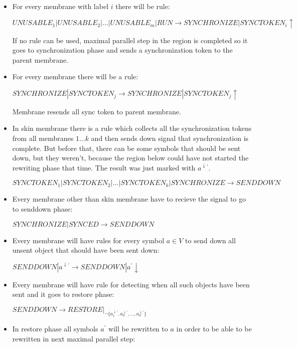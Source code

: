 \documentclass[a4paper,10pt]{article}
\begin{document}
\begin{dokaz}
\begin{itemize}
    

    \item For every membrane with label $i$ there will be rule:

    $UNUSABLE_1|UNUSABLE_2|\dots|UNUSABLE_m|RUN \rightarrow SYNCHRONIZE|SYNCTOKEN_i\uparrow$

    If no rule can be used, maximal parallel step in the region is completed so it goes to synchronization phase and sends a synchronization token to the parent membrane.

    \item For every membrane there will be a rule:

    $SYNCHRONIZE|SYNCTOKEN_j \rightarrow SYNCHRONIZE|SYNCTOKEN_j\uparrow$

    Membrane resends all sync token to parent membrane.

    \item In skin membrane there is a rule which collects all the synchronization tokens from all membranes $1\dots k$ and then sends down signal that synchronization is complete. But before that, there can be some symbols that should be sent down, but they weren't, because the region below could have not started the rewriting phase that time. The result was just marked with $a^{\downarrow\prime}$.

    $SYNCTOKEN_1|SYNCTOKEN_2|\dots|SYNCTOKEN_k|SYNCHRONIZE \rightarrow SENDDOWN$

    \item Every membrane other than skin membrane have to recieve the signal to go to senddown phase:

    $SYNCHRONIZE|SYNCED \rightarrow SENDDOWN$

    \item Every membrane will have rules for every symbol $a\in V$ to send down all unsent object that should have been sent down:

    $SENDDOWN|a^{\downarrow\prime} \rightarrow SENDDOWN|a^{\prime}\downarrow$

    \item Every membrane will have rule for detecting when all such objects have been sent and it goes to restore phase:

    $SENDDOWN \rightarrow RESTORE|_{\neg \{a_1^{\downarrow\prime}, a_n^{\downarrow\prime}, \dots, a_n^{\downarrow\prime}\}}$

    \item In restore phase all symbols $a^{\prime}$ will be rewritten to $a$ in order to be able to be rewritten in next maximal parallel step:


\end{itemize}
\end{dokaz}
\end{document}
